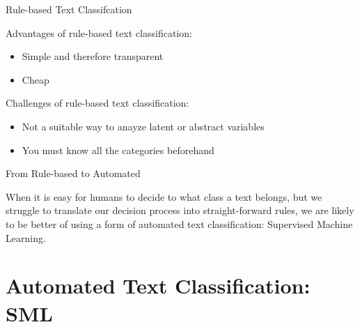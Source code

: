 \documentclass[handout]{beamer}
\begin{document}
	\begin{frame}{Rule-based Text Classifcation} 
	
	Advantages of rule-based text classification:
	\begin{itemize}
		\item Simple and therefore transparent
		\item Cheap
	\end{itemize}
	
	Challenges of rule-based text classification:
	\begin{itemize}
		\item Not a suitable way to anayze latent or abstract variables 
		\item You must know all the categories beforehand
	\end{itemize}

	\end{frame}


\begin{frame}{From Rule-based to Automated}

	When it is easy for humans to decide to what class a text belongs, but we struggle to translate our decision process into straight-forward rules, we are likely to be better of using a form of automated text classification: Supervised Machine Learning.
	
\end{frame}


	
	\section{Automated Text Classification: SML}
	
\end{document}
